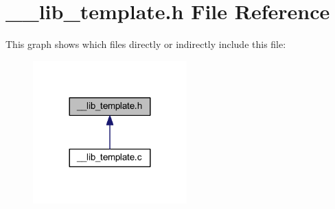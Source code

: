 \section{\-\_\-\-\_\-lib\-\_\-template.\-h File Reference}
\label{____lib__template_8h}
This graph shows which files directly or indirectly include this file\-:\nopagebreak
\begin{figure}[H]
\begin{center}
\leavevmode
\includegraphics[width=168pt]{____lib__template_8h__dep__incl}
\end{center}
\end{figure}
